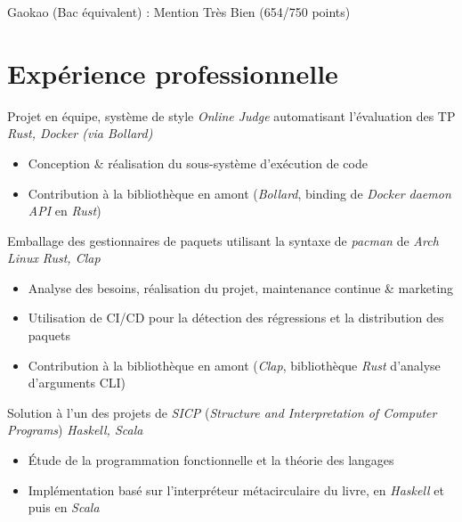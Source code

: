 \documentclass{resume}
\begin{document}
Gaokao (Bac équivalent) : Mention Très Bien (654/750 points)


\section{Expérience professionnelle}
Projet en équipe, système de style \textit{Online Judge} automatisant l'évaluation des TP \hfill \textit{Rust, Docker (via Bollard)}
\begin{itemize}
  \item Conception \& réalisation du sous-système d'exécution de code
  \item Contribution à la bibliothèque en amont (\textit{Bollard}, binding de \textit{Docker daemon API} en \textit{Rust})
\end{itemize}

Emballage des gestionnaires de paquets utilisant la syntaxe de \textit{pacman} de \textit{Arch Linux} \hfill \textit{Rust, Clap}
\begin{itemize}
  \item Analyse des besoins, réalisation du projet, maintenance continue \& marketing
  \item Utilisation de CI/CD pour la détection des régressions et la distribution des paquets
  \item Contribution à la bibliothèque en amont (\textit{Clap}, bibliothèque \textit{Rust} d'analyse d'arguments CLI)
\end{itemize}

Solution à l'un des projets de \textit{SICP} (\textit{Structure and Interpretation of Computer Programs}) \hfill \textit{Haskell, Scala}
\begin{itemize}
  \item Étude de la programmation fonctionnelle et la théorie des langages
  \item Implémentation basé sur l'interpréteur métacirculaire du livre, en \textit{Haskell} et puis en \textit{Scala}
\end{itemize}
\end{document}
